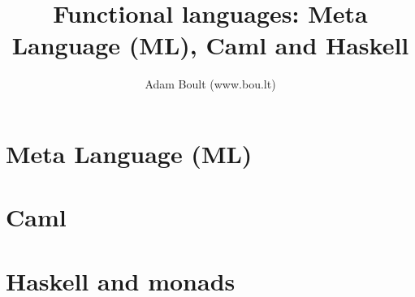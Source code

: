 \documentclass[oneside]{book}
\begin{document}
\author{Adam Boult (www.bou.lt)}
\title{Functional languages: Meta Language (ML), Caml and Haskell}
\maketitle

\setcounter{tocdepth}{0}
\tableofcontents



\part{Meta Language (ML)}

\part{Caml}

\part{Haskell and monads}
\end{document}
